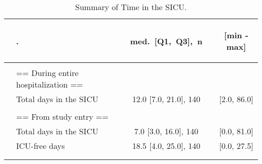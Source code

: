 \documentclass[dvips, 10pt]{article}
\begin{document}
\begin{table}[t]
\caption
{ Summary of Time in the SICU. }
\begin{center}
\begin{tabular}{ @{}l@{}
@{}l@{}@{}p{1.5em}@{}@{}c@{}@{}p{1.5em}@{}@{}c@{}
}
\hline

& \parbox{6em}{\begin{center}.\end{center}} && \parbox{6em}{\begin{center}med.~[Q1,~Q3],~n\end{center}} && \parbox{6em}{\begin{center}[min - max]\end{center}} \\

\hline

\\
& == During entire hospitalization == &&  &&  \\
& Total days in the SICU && 12.0 [7.0, 21.0], 140 && [2.0, 86.0] \\
&  &&  &&  \\
& == From study entry == &&  &&  \\
& Total days in the SICU && 7.0 [3.0, 16.0], 140 && [0.0, 81.0] \\
& ICU-free days && 18.5 [4.0, 25.0], 140 && [0.0, 27.5] \\
\\
\hline \\

\end{tabular}

\end{center}
 \end{table}
\end{document}

